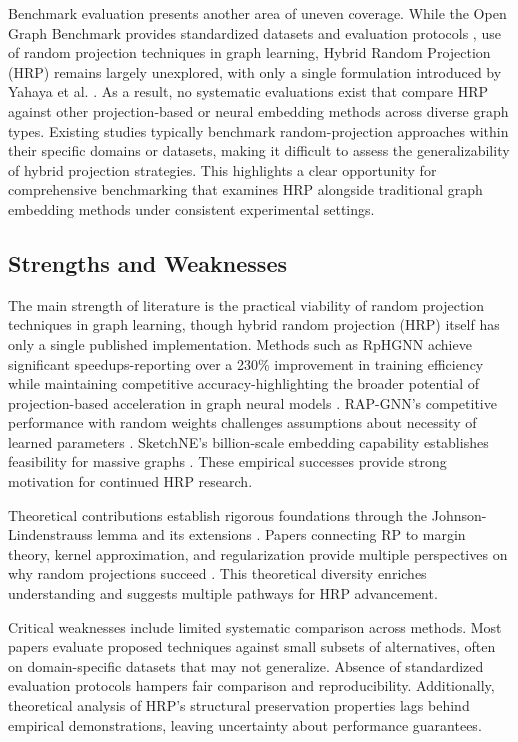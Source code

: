 \documentclass[conference]{IEEEtran}
\begin{document}
Benchmark evaluation presents another area of uneven coverage. While the Open Graph Benchmark provides standardized datasets and evaluation protocols \cite{hu2020ogb}, use of random projection techniques in graph learning, Hybrid Random Projection (HRP) remains largely unexplored, with only a single formulation introduced by Yahaya et al. \cite{yahaya2025hrp}. As a result, no systematic evaluations exist that compare HRP against other projection-based or neural embedding methods across diverse graph types. Existing studies typically benchmark random-projection approaches within their specific domains or datasets, making it difficult to assess the generalizability of hybrid projection strategies. This highlights a clear opportunity for comprehensive benchmarking that examines HRP alongside traditional graph embedding methods under consistent experimental settings.

\subsection{Strengths and Weaknesses}

The main strength of literature is the practical viability of random projection techniques in graph learning, though hybrid random projection (HRP) itself has only a single published implementation. Methods such as RpHGNN achieve significant speedups-reporting over a 230\% improvement in training efficiency while maintaining competitive accuracy-highlighting the broader potential of projection-based acceleration in graph neural models \cite{hu2021rphgnn}. RAP-GNN's competitive performance with random weights challenges assumptions about necessity of learned parameters \cite{bui2023rap}. SketchNE's billion-scale embedding capability establishes feasibility for massive graphs \cite{xie2023sketchne}. These empirical successes provide strong motivation for continued HRP research.

Theoretical contributions establish rigorous foundations through the Johnson-Lindenstrauss lemma and its extensions \cite{johnson1984, achlioptas2003}. Papers connecting RP to margin theory, kernel approximation, and regularization provide multiple perspectives on why random projections succeed \cite{blum2006, nguyen2016}. This theoretical diversity enriches understanding and suggests multiple pathways for HRP advancement.

Critical weaknesses include limited systematic comparison across methods. Most papers evaluate proposed techniques against small subsets of alternatives, often on domain-specific datasets that may not generalize. Absence of standardized evaluation protocols hampers fair comparison and reproducibility. Additionally, theoretical analysis of HRP's structural preservation properties lags behind empirical demonstrations, leaving uncertainty about performance guarantees.
\end{document}
